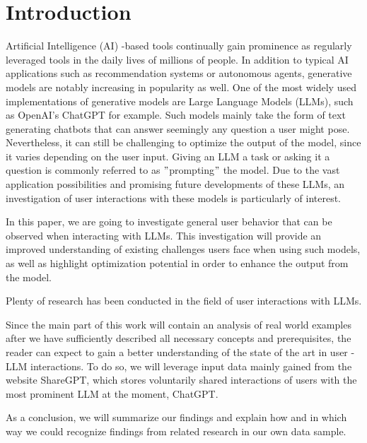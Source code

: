 
\section{Introduction}
\label{sec:introduction}

\sloppy %
Artificial Intelligence (AI) -based tools continually gain prominence as regularly leveraged tools in the
daily lives of millions of people.
In addition to typical AI applications such as recommendation systems or autonomous agents, generative
models are notably increasing in popularity as well.
One of the most widely used implementations of generative models are Large Language Models (LLMs),
such as OpenAI's ChatGPT for example.%
Such models mainly take the form of text generating chatbots that can answer seemingly any question
a user might pose.
Nevertheless, it can still be challenging to optimize the output of the model, since it varies depending
on the user input.
Giving an LLM a task or asking it a question is commonly referred to as \("\)prompting\("\) the model.
Due to the vast application possibilities and promising future developments of these LLMs,
an investigation of user interactions with these models is particularly of interest.


In this paper, we are going to investigate general user behavior that can be observed when interacting
with LLMs.
This investigation will provide an improved understanding of existing challenges users face when
using such models, as well as highlight optimization potential in order to enhance the output from
the model.

Plenty of research has been conducted in the field of user interactions with LLMs.

Since the main part of this work will contain an analysis of real world examples after we have
sufficiently described all necessary concepts and prerequisites, the reader can expect to gain a better
understanding of the state of the art in user - LLM interactions.
To do so, we will leverage input data mainly gained from the website ShareGPT, %
which stores voluntarily shared interactions of users with the most prominent LLM at the moment,
ChatGPT. %

As a conclusion, we will summarize our findings and explain how and in which way we could recognize
findings from related research in our own data sample.